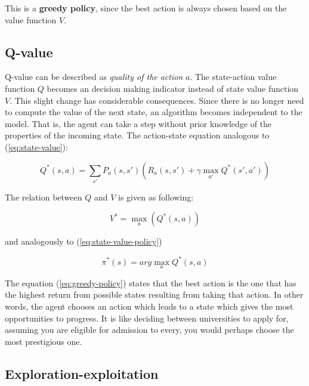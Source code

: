 This is a \textbf{greedy policy}, since the best action is always chosen based on the value function $V$.

\newpage

\subsection{Q-value}
\label{sub:q-val}

Q-value can be described as \emph{quality of the action} $a$. The state-action value function $Q$ becomes an decision making indicator instead of state value function $V$. This slight change has considerable consequences. Since there is no longer need to compute the value of the next state, an algorithm becomes independent to the model. That is, the agent can take a step without prior knowledge of the properties of the incoming state. The action-state equation analogous to (\ref{eq:state-value}):

\begin{equation}
    Q^{*}(s, a) = \sum_{s'} P_a(s, s') \left(R_a(s, s') + \gamma \max_{a'} Q^{*}(s', a') \right)
\label{eq:q-value}
\end{equation}

The relation between $Q$ and $V$ is given as following:

\begin{equation}
    V^{*} = \max_a \left(Q^{*} (s, a)\right)
\end{equation}

and analogously to (\ref{eq:state-value-policy})

\begin{equation}
    \pi^{*}(s) = arg \max_a Q^{*}(s, a)
    \label{eq:greedy-policy}
\end{equation}

The equation (\ref{eq:greedy-policy}) states that the best action is the one that has the highest return from possible states resulting from taking that action.
In other words, the agent chooses an action which leads to a state which gives the most opportunities to progress. It is like deciding between universities to apply for, assuming you are eligible for admission to every, you would perhaps choose the most prestigious one.

\subsection{Exploration-exploitation}
\label{sub:exploration-exploitation}

